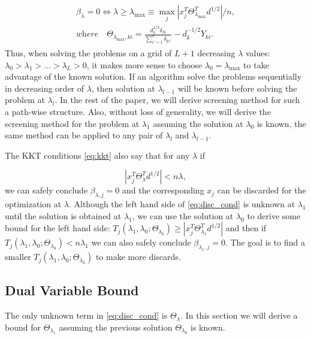 \begin{gather}
    \label{eq:lammax}
    \begin{aligned}
        \beta_\lambda=0\iff \lambda \geq \lambda_{\max}\equiv \max_j \left|x_j^T\Theta^T_{\lambda_{\max}}d^{1/2}\right|/n,\\
        \textit{where}\quad\Theta_{\lambda_{\max},ki}=\frac{d_k^{1/2}\delta_{ki}}{\sum_{i'=1}^n\delta_{ki'}}-d_k^{-1/2}Y_{ki}.
    \end{aligned}
\end{gather}
Thus, when solving the problems on a grid of $L+1$ decreasing $\lambda$ values: $\lambda_0>\lambda_1>...>\lambda_L>0$, it makes more sense to choose $\lambda_0= \lambda_{\max}$ to take advantage of the known solution. If an algorithm solve the problems sequentially in decreasing order of $\lambda$, then solution at $\lambda_{l-1}$ will be known before solving the problem at $\lambda_l$. In the rest of the paper, we will derive screening method for such a path-wise structure. Also, without loss of generality, we will derive the screening method for the problem at $\lambda_1$ assuming the solution at $\lambda_0$ is known, the same method can be applied to any pair of $\lambda_{l}$ and $\lambda_{l-1}$.

The KKT conditions \eqref{eq:kkt} also say that for any $\lambda$ if 

\begin{equation}
    \label{eq:disc_cond}
    |x_j^T\Theta_{\lambda}^Td^{1/2}|<n\lambda,
\end{equation}
we can safely conclude $\beta_{\lambda,j}=0$ and the corresponding $x_j$ can be discarded for the optimization at $\lambda$. Although the left hand side of \eqref{eq:disc_cond} is unknown at $\lambda_1$ until the solution is obtained at $\lambda_1$, we can use the solution at $\lambda_{0}$ to derive some bound for the left hand side: $T_j(\lambda_{1},\lambda_{0};\Theta_{\lambda_0})\geq |x_j^T\Theta_{\lambda_1}^Td^{1/2}|$ and then if $T_j(\lambda_{1},\lambda_{0};\Theta_{\lambda_0})<n\lambda_1$ we can also safely conclude $\beta_{\lambda_1,j}=0$. The goal is to find a smaller $T_j(\lambda_{1},\lambda_{0};\Theta_{\lambda_0})$ to make more discards.

\subsection{Dual Variable Bound}

The only unknown term in \eqref{eq:disc_cond} is $\Theta_{\lambda}$. In this section we will derive a bound for $\Theta_{\lambda_1}$ assuming the previous solution $\Theta_{\lambda_{0}}$ is known.

